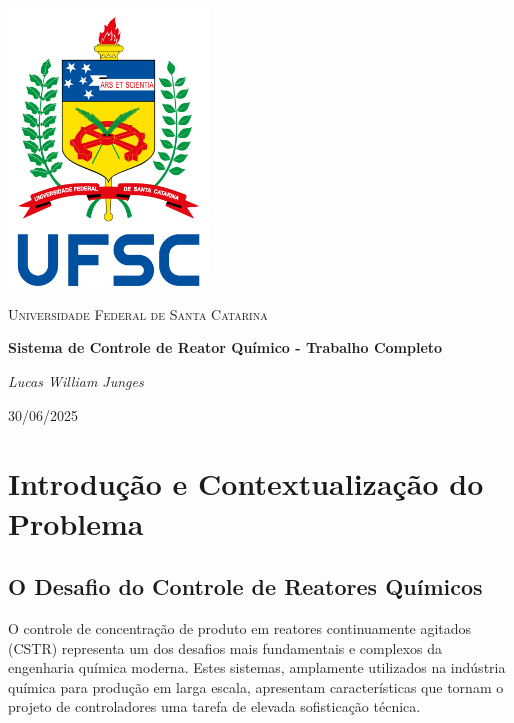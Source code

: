 \documentclass[a4paper,12pt]{article}
\newcommand{\reporttitle}{Sistema de Controle de Reator Químico - Trabalho Completo}
\newcommand{\reportauthor}{
Lucas William Junges}
\newcommand{\reportdate}{30/06/2025}
\begin{document}
\begin{titlepage}
    \centering
    \vspace*{1cm}
    \includegraphics[width=0.4\textwidth]{Imagens/BrasaoUFSC.png} %
    \par\vspace{1cm}
    {\scshape\Large Universidade Federal de Santa Catarina\par} %
    \vspace{1.2cm}
    {\huge\bfseries \reporttitle\par}
    \vspace{2cm}
    {\Large\itshape \reportauthor\par}
    \vfill
    {\large \reportdate\par}
\end{titlepage}

\listoffigures
\clearpage

\tableofcontents
\clearpage



\section{Introdução e Contextualização do Problema}

\subsection{O Desafio do Controle de Reatores Químicos}

O controle de concentração de produto em reatores continuamente agitados (CSTR) representa um dos desafios mais fundamentais e complexos da engenharia química moderna. Estes sistemas, amplamente utilizados na indústria química para produção em larga escala, apresentam características que tornam o projeto de controladores uma tarefa de elevada sofisticação técnica.
\end{document}
